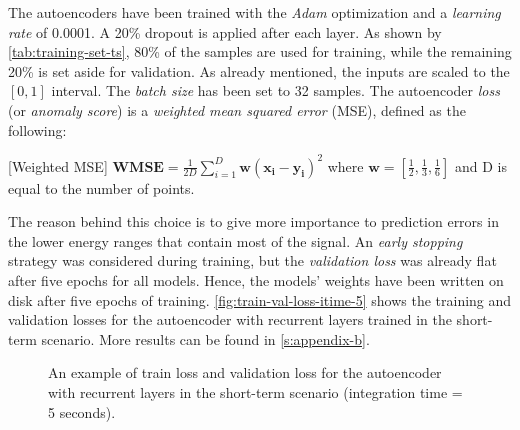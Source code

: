 The autoencoders have been trained with the \textit{Adam} optimization \cite{Kingma_2014} and a \textit{learning rate} of 0.0001. A 20\% dropout is applied after each layer. As shown by \autoref{tab:training-set-ts}, 80\% of the samples are used for training, while the remaining 20\% is set aside for validation. As already mentioned, the inputs are scaled to the $[0, 1]$ interval. The \textit{batch size} has been set to 32 samples. The autoencoder \textit{loss} (or \textit{anomaly score}) is a \textit{weighted mean squared error} (MSE), defined as the following:
\begin{definition} \label{def:wmse}
[Weighted MSE] $\textbf{WMSE}=\frac{1}{2D}\sum_{i=1}^{D}\bm{w}(\bm{x_i}-\bm{y_i})^2$ where $\bm{w}=[\frac{1}{2}, \frac{1}{3}, \frac{1}{6}]$ and D is equal to the number of points. 
\end{definition}
The reason behind this choice is to give more importance to prediction errors in the lower energy ranges that contain most of the signal. An \textit{early stopping} strategy was considered during training, but the \textit{validation loss} was already flat after five epochs for all models. Hence, the models' weights have been written on disk after five epochs of training. \autoref{fig:train-val-loss-itime-5} shows the training and validation losses for the autoencoder with recurrent layers trained in the short-term scenario. More results can be found in \autoref{s:appendix-b}.
\begin{figure}[t]
    \centering
    \begin{minipage}{1\textwidth}
       \centering
        
    \end{minipage}
    \caption{An example of train loss and validation loss for the autoencoder with recurrent layers in the short-term scenario (integration time = 5 seconds).}
    \label{fig:train-val-loss-itime-5}
\end{figure}
 


